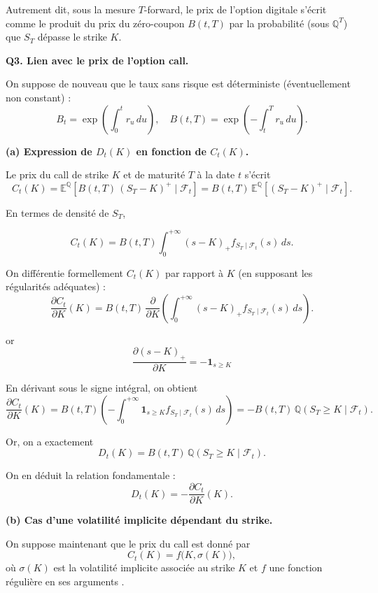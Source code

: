 Autrement dit, sous la mesure $T$-forward, le prix de l'option digitale s'écrit
comme le produit du prix du zéro-coupon $B(t,T)$ par la probabilité (sous
$\mathbb{Q}^T$) que $S_T$ dépasse le strike $K$.

\bigskip

\textbf{Q3. Lien avec le prix de l'option call.}

On suppose de nouveau que le taux sans risque est déterministe (éventuellement non constant) :
\[
B_t = \exp\!\left(\int_0^t r_u \, du\right), \quad
B(t,T) = \exp\!\left(-\int_t^T r_u \, du\right).
\]

\medskip

\textbf{(a) Expression de $D_t(K)$ en fonction de $C_t(K)$.}

Le prix du call de strike $K$ et de maturité $T$ à la date $t$ s'écrit
\[
C_t(K) = \mathbb{E}^{\mathbb{Q}}\!\left[
B(t,T)\,(S_T - K)^+ \mid \mathcal{F}_t
\right]
= B(t,T)\, \mathbb{E}^{\mathbb{Q}}\!\left[(S_T - K)^+ \mid \mathcal{F}_t \right].
\]

En termes de densité de $S_T$,

\[
C_t(K) = B(t,T)\int_0^{+\infty} (s-K)_+ f_{S_T\mid\mathcal{F}_t}(s)\, ds.
\]

On différentie formellement $C_t(K)$ par rapport à $K$ (en supposant les régularités
adéquates) :
\[
\frac{\partial C_t}{\partial K}(K)
= B(t,T)\, \frac{\partial}{\partial K}
\left( \int_0^{+\infty} (s-K)_+ f_{S_T\mid\mathcal{F}_t}(s)\, ds \right).
\]

or 
\[
\frac{\partial (s - K)_+}{\partial K} = - \mathbf{1}_{s \ge K}
\]

En dérivant sous le signe intégral, on obtient
\[
\frac{\partial C_t}{\partial K}(K)
= B(t,T)\left(
- \int_0^{+\infty} \mathbf{1}_{s \ge K} f_{S_T\mid\mathcal{F}_t}(s)\, ds
\right)
= -B(t,T)\, \mathbb{Q}(S_T \ge K \mid \mathcal{F}_t).
\]

Or, on a exactement
\[
D_t(K) = B(t,T)\, \mathbb{Q}(S_T \ge K \mid \mathcal{F}_t).
\]

On en déduit la relation fondamentale :
\[
\boxed{
D_t(K) = - \frac{\partial C_t}{\partial K}(K).
}
\]

\medskip

\textbf{(b) Cas d'une volatilité implicite dépendant du strike.}

On suppose maintenant que le prix du call est donné par
\[
C_t(K) = f\big(K, \sigma(K)\big),
\]
où $\sigma(K)$ est la volatilité implicite associée au strike $K$ et $f$ une fonction
régulière en ses arguments .

